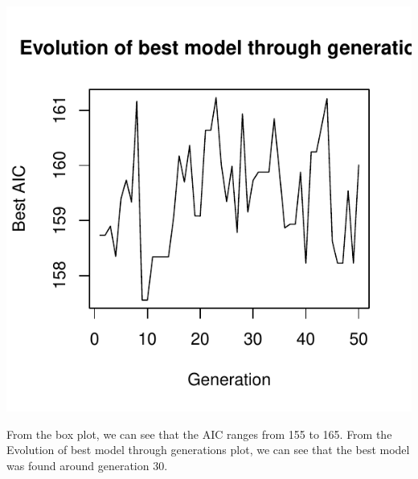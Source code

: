 \documentclass{article}\usepackage[]{graphicx}\usepackage[]{color}
\makeatletter
\def\maxwidth{ %
  \ifdim\Gin@nat@width>\linewidth
    \linewidth
  \else
    \Gin@nat@width
  \fi
}
\newenvironment{knitrout}{}{} %
\makeatother
\begin{document}
\begin{knitrout}
\includegraphics[width=\maxwidth]{figure/latex-unnamed-chunk-32} 

\end{knitrout}

From the box plot, we can see that the AIC ranges from 155 to 165. 
From the Evolution of best model through generations plot, we can see that 
the best model was found around generation 30. 
\end{document}

